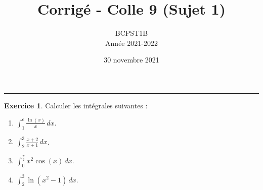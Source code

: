 \documentclass[a4paper, 11pt,openany]{article}%
\title{Corrigé - Colle 9 (Sujet 1)}
\author{BCPST1B\\
Année 2021-2022}
\date{30 novembre 2021}
\theoremstyle{plain}
\theoremstyle{definition}
\newtheorem{exo}{Exercice}
\theoremstyle{remark}
\begin{document}
   \maketitle
      \rule{\linewidth}{0.5mm}



\begin{exo}
Calculer les intégrales suivantes :
\begin{multicols}{2}
\begin{enumerate}
\item $\displaystyle{\int_1^e \frac{\ln(x)}{x} \, dx}$.
\item $\displaystyle{\int_2^3 \frac{x+2}{x+1} \, dx}$.
\item $\displaystyle{\int_0^{\frac{\pi}{2}}  x^2 \cos(x) \, dx}$.
\item $\displaystyle{\int_2^3 \ln(x^2 - 1) \, dx}$.
\end{enumerate}
\end{multicols}
\end{exo}
\end{document}
